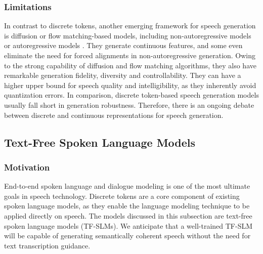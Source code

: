 \subsubsection{Limitations}
In contrast to discrete tokens, another emerging framework for speech generation is diffusion or flow matching-based models, including non-autoregressive models \cite{lee2023hierspeech++,le2024voicebox,liu2024e1,chen2024f5} or autoregressive models \cite{meng2024autoregressive,liu2024autoregressive,zhu2024autoregressive,turetzky2024continuous,jia2025ditar}.
They generate continuous features, and some even eliminate the need for forced alignments in non-autoregressive generation.
Owing to the strong capability of diffusion and flow matching algorithms, they also have remarkable generation fidelity, diversity and controllability.
They can have a higher upper bound for speech quality and intelligibility, as they inherently avoid quantization errors.
In comparison, discrete token-based speech generation models usually fall short in generation robustness.
Therefore, there is an ongoing debate between discrete and continuous representations for speech generation.

\subsection{Text-Free Spoken Language Models}
\subsubsection{Motivation}
End-to-end spoken language and dialogue modeling is one of the most ultimate goals in speech technology.
Discrete tokens are a core component of existing spoken language models, as they enable the language modeling technique to be applied directly on speech. The models discussed in this subsection are text-free spoken language models (TF-SLMs). 
We anticipate that a well-trained TF-SLM will be capable of generating semantically coherent speech without the need for text transcription guidance.

